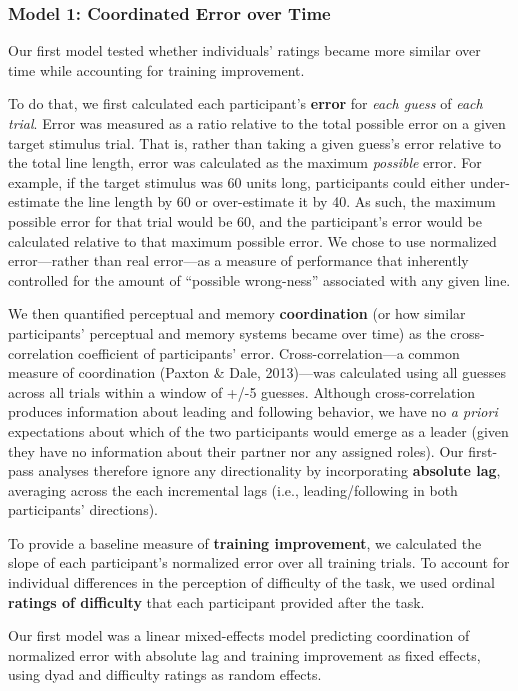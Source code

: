 \documentclass[10pt, letterpaper]{article}
\begin{document}
\subsubsection{Model 1: Coordinated Error over
Time}\label{model-1-coordinated-error-over-time}

Our first model tested whether individuals' ratings became more similar
over time while accounting for training improvement.

To do that, we first calculated each participant's \textbf{error} for
\emph{each guess} of \emph{each trial}. Error was measured as a ratio
relative to the total possible error on a given target stimulus trial.
That is, rather than taking a given guess's error relative to the total
line length, error was calculated as the maximum \emph{possible} error.
For example, if the target stimulus was 60 units long, participants
could either under-estimate the line length by 60 or over-estimate it by
40. As such, the maximum possible error for that trial would be 60, and
the participant's error would be calculated relative to that maximum
possible error. We chose to use normalized error---rather than real
error---as a measure of performance that inherently controlled for the
amount of ``possible wrong-ness'' associated with any given line.

We then quantified perceptual and memory \textbf{coordination} (or how
similar participants' perceptual and memory systems became over time) as
the cross-correlation coefficient of participants' error.
Cross-correlation---a common measure of coordination (Paxton \& Dale,
2013)---was calculated using all guesses across all trials within a
window of +/-5 guesses. Although cross-correlation produces information
about leading and following behavior, we have no \emph{a priori}
expectations about which of the two participants would emerge as a
leader (given they have no information about their partner nor any
assigned roles). Our first-pass analyses therefore ignore any
directionality by incorporating \textbf{absolute lag}, averaging across
the each incremental lags (i.e., leading/following in both participants'
directions).

To provide a baseline measure of \textbf{training improvement}, we
calculated the slope of each participant's normalized error over all
training trials. To account for individual differences in the perception
of difficulty of the task, we used ordinal \textbf{ratings of
difficulty} that each participant provided after the task.

Our first model was a linear mixed-effects model predicting coordination
of normalized error with absolute lag and training improvement as fixed
effects, using dyad and difficulty ratings as random effects.
\end{document}
